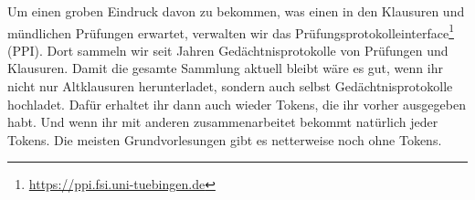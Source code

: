 Um einen groben Eindruck davon zu bekommen, was einen in den Klausuren und
mündlichen Prüfungen erwartet, verwalten wir das
Pr\"ufungsprotokolleinterface\footnote{\url{https://ppi.fsi.uni-tuebingen.de}}
(PPI).  Dort sammeln wir seit Jahren Ged\"achtnisprotokolle von Prüfungen und
Klausuren.  Damit die gesamte Sammlung aktuell bleibt wäre es gut, wenn ihr
nicht nur Altklausuren herunterladet, sondern auch selbst Gedächtnisprotokolle hochladet.
Dafür erhaltet ihr dann auch wieder Tokens, die ihr vorher ausgegeben habt. Und
wenn ihr mit anderen zusammenarbeitet bekommt natürlich jeder Tokens.  Die
meisten Grundvorlesungen gibt es netterweise noch ohne Tokens.

